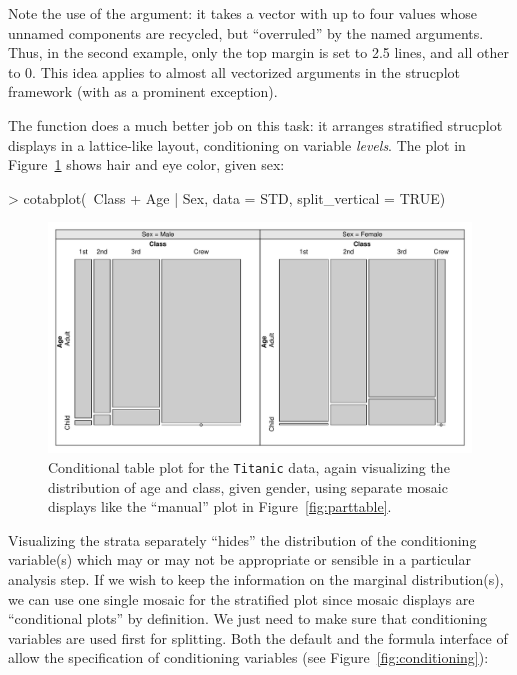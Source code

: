 \documentclass{Z}
\newcommand{\data}[1]{\texttt{#1}}
\newcommand{\codefun}[1]{\code{#1()}}
\begin{document}
\noindent Note the use of the  argument: it takes a
vector with up to four values whose unnamed components are recycled,
but ``overruled'' by the named arguments. Thus, in the second example, only
the top margin is set to 2.5 lines, and all other to 0.
This idea applies to almost all
vectorized arguments in the strucplot framework (with
 as a prominent exception).

The \codefun{cotabplot} function does a much better job on this task:
it arranges stratified strucplot displays 
in a lattice-like layout, conditioning on variable \emph{levels}.
The plot in Figure~\ref{fig:cotabplot} shows hair and eye color, given sex:

\begin{Schunk}
\begin{Sinput}
> cotabplot(~Class + Age | Sex, data = STD, split_vertical = TRUE)
\end{Sinput}
\end{Schunk}

\begin{figure}[p]
\begin{center}
\includegraphics{strucplot-cotabplotfig}
\caption{Conditional table plot for the \data{Titanic} data,
  again visualizing the distribution of age and class, given
  gender, using separate mosaic displays like the ``manual'' plot 
  in Figure~\ref{fig:parttable}.}
\label{fig:cotabplot}
\end{center}
\end{figure}

\noindent Visualizing the strata separately ``hides'' the distribution of the
conditioning variable(s) which may or may not be appropriate or
sensible in a particular analysis step. If we wish to keep the
information on the marginal distribution(s), we can use one single
mosaic for the stratified plot since mosaic displays are 
``conditional plots'' by definition. We just need to make sure that
conditioning variables are used first for splitting. 
Both the default and the formula interface of \codefun{mosaic} allow the
specification of conditioning variables (see Figure~\ref{fig:conditioning}):
\end{document}
